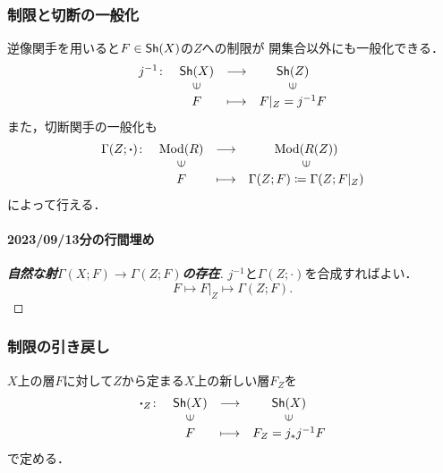 \subsubsection{制限と切断の一般化}
逆像関手を用いると\(F\in\mathop{\textsf{Sh}}\nolimits(X)\)の\(Z\)への制限が
開集合以外にも一般化できる．
\[
    \begin{array}{rccc}
        j^{-1}\colon&   \Sh(X)& \longrightarrow& \Sh(Z)\\
        &   \rotatebox{90}{$\in$}&&\rotatebox{90}{$\in$}\\
        &   F&  \longmapsto&    F|_Z=j^{-1} F   
    \end{array}
\]
また，切断関手の一般化も
\[
    \begin{array}{rccc}
        \Gamma(Z;{\boldsymbol{\cdot}})\colon&\Mod(R)&\longrightarrow&\Mod(R(Z))\\
        &\rotatebox{90}{$\in$}&&\rotatebox{90}{$\in$}\\
        &F&\longmapsto&\Gamma(Z;F)\coloneqq \Gamma(Z;F|_Z)
    \end{array}
\]
によって行える．


\paragraph{2023/09/13分の行間埋め}

\begin{proof}[\textbf{自然な射\(\Gamma(X;F)\to\Gamma(Z;F)\)の存在}]
    \(j^{-1}\)と\(\Gamma(Z;\boldsymbol{\cdot})\)を合成すればよい．
    \[
        F\mapsto F|_Z\mapsto \Gamma(Z;F).
    \]
\end{proof}

\subsubsection{制限の引き戻し}

\(X\)上の層\(F\)に対して\(Z\)から定まる\(X\)上の新しい層\(F_Z\)を
\[
    \begin{array}{rccc}
        {\boldsymbol{\cdot}}_Z\colon&   \Sh(X)& \longrightarrow& \Sh(X)\\
        &   \rotatebox{90}{$\in$}&&\rotatebox{90}{$\in$}\\
        &   F&  \longmapsto&    F_Z=j_\ast j^{-1} F   
    \end{array}
\]
で定める．


















